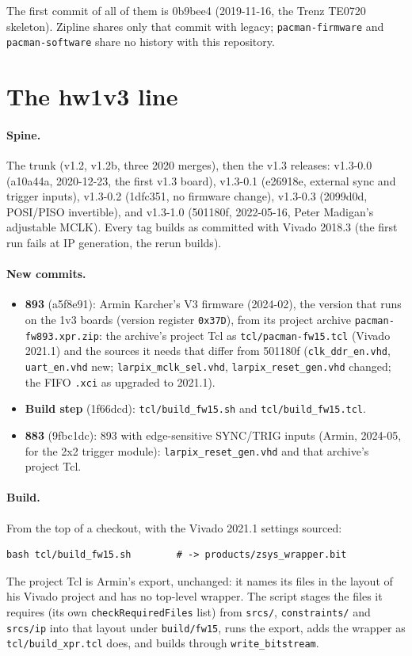 \documentclass[11pt]{article}
\newcommand{\h}[1]{\texttt{#1}}
\begin{document}
The first commit of all of them is 0b9bee4 (2019-11-16, the Trenz TE0720 skeleton).  Zipline shares only that
commit with legacy; \h{pacman-firmware} and \h{pacman-software} share no history with this repository.

\section{The hw1v3 line}

\paragraph{Spine.}  The trunk (v1.2, v1.2b, three 2020 merges), then the v1.3 releases:  v1.3-0.0 (a10a44a,
2020-12-23, the first v1.3 board), v1.3-0.1 (e26918e, external sync and trigger inputs), v1.3-0.2 (1dfc351, no
firmware change), v1.3-0.3 (2099d0d, POSI/PISO invertible), and v1.3-1.0 (501180f, 2022-05-16, Peter Madigan's
adjustable MCLK).  Every tag builds as committed with Vivado 2018.3 (the first run fails at IP generation, the
rerun builds).

\paragraph{New commits.}
\begin{itemize}
\item \textbf{893} (a5f8e91): Armin Karcher's V3 firmware (2024-02), the version that runs on the 1v3 boards
  (version register \h{0x37D}), from its project archive \h{pacman-fw893.xpr.zip}: the archive's project Tcl as
  \h{tcl/pacman-fw15.tcl} (Vivado 2021.1) and the sources it needs that differ from 501180f
  (\h{clk\_ddr\_en.vhd}, \h{uart\_en.vhd} new; \h{larpix\_mclk\_sel.vhd}, \h{larpix\_reset\_gen.vhd} changed; the
  FIFO \h{.xci} as upgraded to 2021.1).
\item \textbf{Build step} (1f66dcd): \h{tcl/build\_fw15.sh} and \h{tcl/build\_fw15.tcl}.
\item \textbf{883} (9fbc1dc): 893 with edge-sensitive SYNC/TRIG inputs (Armin, 2024-05, for the 2x2 trigger
  module): \h{larpix\_reset\_gen.vhd} and that archive's project Tcl.
\end{itemize}

\paragraph{Build.}  From the top of a checkout, with the Vivado 2021.1 settings sourced:
\begin{verbatim}
bash tcl/build_fw15.sh        # -> products/zsys_wrapper.bit
\end{verbatim}
The project Tcl is Armin's export, unchanged: it names its files in the layout of his Vivado project and has no
top-level wrapper.  The script stages the files it requires (its own \h{checkRequiredFiles} list) from
\h{srcs/}, \h{constraints/} and \h{srcs/ip} into that layout under \h{build/fw15}, runs the export, adds the
wrapper as \h{tcl/build\_xpr.tcl} does, and builds through \h{write\_bitstream}.
\end{document}
